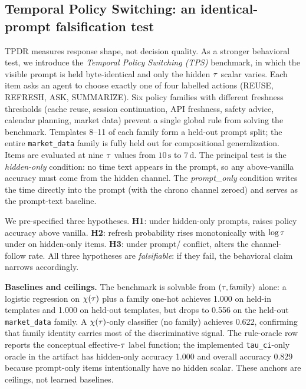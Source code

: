 \subsection{Temporal Policy Switching: an identical-prompt falsification test}

TPDR measures response shape, not decision quality. As a stronger behavioral test, we introduce the \emph{Temporal Policy Switching (TPS)} benchmark, in which the visible prompt is held byte-identical and only the hidden $\tau$ scalar varies. Each item asks an agent to choose exactly one of four labelled actions (REUSE, REFRESH, ASK, SUMMARIZE). Six policy families with different freshness thresholds (cache reuse, session continuation, API freshness, safety advice, calendar planning, market data) prevent a single global rule from solving the benchmark. Templates 8--11 of each family form a held-out prompt split; the entire \texttt{market\_data} family is fully held out for compositional generalization. Items are evaluated at nine $\tau$ values from $10\,\mathrm{s}$ to $7\,\mathrm{d}$. The principal test is the \emph{hidden-only} condition: no time text appears in the prompt, so any above-vanilla accuracy must come from the hidden channel. The \emph{prompt\_only} condition writes the time directly into the prompt (with the chrono channel zeroed) and serves as the prompt-text baseline.

We pre-specified three hypotheses. \textbf{H1}: under hidden-only prompts, \CI{} raises policy accuracy above vanilla. \textbf{H2}: refresh probability rises monotonically with $\log\tau$ under \CI{} on hidden-only items. \textbf{H3}: under prompt/\CI{} conflict, \CI{} alters the channel-follow rate. All three hypotheses are \emph{falsifiable}: if they fail, the behavioral claim narrows accordingly.

\textbf{Baselines and ceilings.} The benchmark is solvable from $(\tau, \text{family})$ alone: a logistic regression on $\chi(\tau)$ plus a family one-hot achieves 1.000 on held-in templates and 1.000 on held-out templates, but drops to 0.556 on the held-out \texttt{market\_data} family. A $\chi(\tau)$-only classifier (no family) achieves 0.622, confirming that family identity carries most of the discriminative signal. The rule-oracle row reports the conceptual effective-$\tau$ label function; the implemented \texttt{tau\_ci}-only oracle in the artifact has hidden-only accuracy 1.000 and overall accuracy 0.829 because prompt-only items intentionally have no hidden scalar. These anchors are ceilings, not learned baselines.

